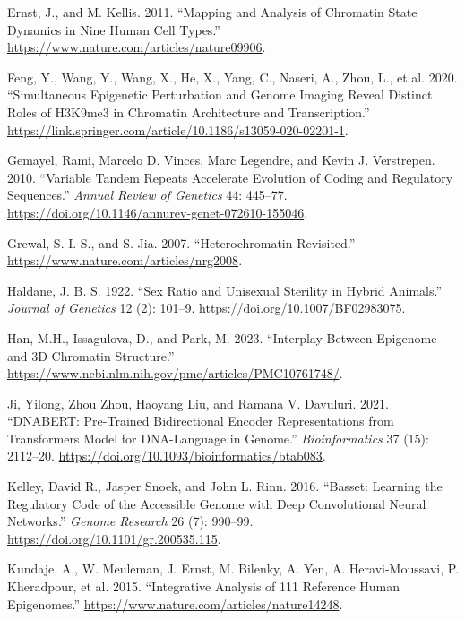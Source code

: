 \documentclass[
  a4paper,
  openany]{scrbook}
\newlength{\cslhangindent}
\newenvironment{CSLReferences}[2] %
 {\begin{list}{}{%
  \setlength{\itemindent}{0pt}
  \setlength{\leftmargin}{0pt}
  \setlength{\parsep}{0pt}
  \ifodd #1
   \setlength{\leftmargin}{\cslhangindent}
   \setlength{\itemindent}{-1\cslhangindent}
  \fi
  \setlength{\itemsep}{#2\baselineskip}}}
 {\end{list}}
\begin{document}
\begin{CSLReferences}{1}{0}
Ernst, J., and M. Kellis. 2011. {``Mapping and Analysis of Chromatin
State Dynamics in Nine Human Cell Types.''}
\url{https://www.nature.com/articles/nature09906}.

Feng, Y., Wang, Y., Wang, X., He, X., Yang, C., Naseri, A., Zhou, L., et
al. 2020. {``Simultaneous Epigenetic Perturbation and Genome Imaging
Reveal Distinct Roles of H3K9me3 in Chromatin Architecture and
Transcription.''}
\url{https://link.springer.com/article/10.1186/s13059-020-02201-1}.

Gemayel, Rami, Marcelo D. Vinces, Marc Legendre, and Kevin J.
Verstrepen. 2010. {``Variable Tandem Repeats Accelerate Evolution of
Coding and Regulatory Sequences.''} \emph{Annual Review of Genetics} 44:
445--77. \url{https://doi.org/10.1146/annurev-genet-072610-155046}.

Grewal, S. I. S., and S. Jia. 2007. {``Heterochromatin Revisited.''}
\url{https://www.nature.com/articles/nrg2008}.

Haldane, J. B. S. 1922. {``Sex Ratio and Unisexual Sterility in Hybrid
Animals.''} \emph{Journal of Genetics} 12 (2): 101--9.
\url{https://doi.org/10.1007/BF02983075}.

Han, M.H., Issagulova, D., and Park, M. 2023. {``Interplay Between
Epigenome and 3D Chromatin Structure.''}
\url{https://www.ncbi.nlm.nih.gov/pmc/articles/PMC10761748/}.

Ji, Yilong, Zhou Zhou, Haoyang Liu, and Ramana V. Davuluri. 2021.
{``DNABERT: Pre-Trained Bidirectional Encoder Representations from
Transformers Model for DNA-Language in Genome.''} \emph{Bioinformatics}
37 (15): 2112--20. \url{https://doi.org/10.1093/bioinformatics/btab083}.

Kelley, David R., Jasper Snoek, and John L. Rinn. 2016. {``Basset:
Learning the Regulatory Code of the Accessible Genome with Deep
Convolutional Neural Networks.''} \emph{Genome Research} 26 (7):
990--99. \url{https://doi.org/10.1101/gr.200535.115}.

Kundaje, A., W. Meuleman, J. Ernst, M. Bilenky, A. Yen, A.
Heravi-Moussavi, P. Kheradpour, et al. 2015. {``Integrative Analysis of
111 Reference Human Epigenomes.''}
\url{https://www.nature.com/articles/nature14248}.


\end{CSLReferences}
\end{document}
